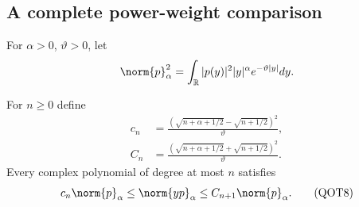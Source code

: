 \documentclass[11pt,a4paper]{article}
\providecommand{\R}{\mathbb R}
\begin{document}
\subsection{A complete power-weight comparison}
For $\alpha>0$, $\vartheta>0$, let
\[
 \norm{p}_\alpha^2=\int_{\R}|p(y)|^2|y|^\alpha e^{-\vartheta|y|}dy.
\]
\begin{QOTlemma}\label{QOT:lem:mult}
For $n\ge0$ define
\begin{equation}
\begin{split}
 c_n&=\frac{(\sqrt{n+\alpha+1/2}-\sqrt{n+1/2})^2}{\vartheta},\\
 C_n&=\frac{(\sqrt{n+\alpha+1/2}+\sqrt{n+1/2})^2}{\vartheta}.
\end{split}\label{QOT:eq:cn}
\tag{QOT7}
\end{equation}
Every complex polynomial of degree at most $n$ satisfies
\begin{equation}
 c_n\norm{p}_\alpha\le\norm{yp}_\alpha\le C_{n+1}\norm{p}_\alpha.
 \label{QOT:eq:mult}
\tag{QOT8}
\end{equation}
\end{QOTlemma}
\end{document}
